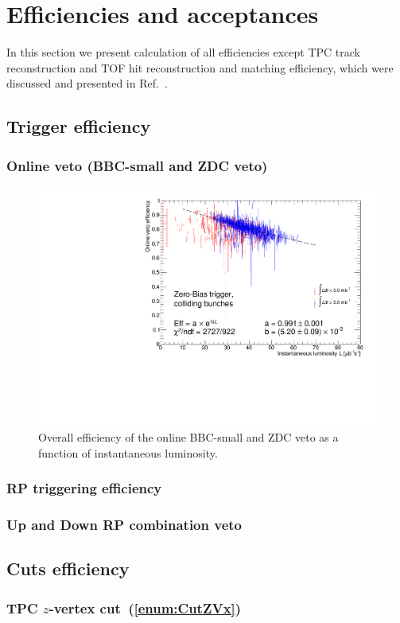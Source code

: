 \section{Efficiencies and acceptances}

In this section we present calculation of all efficiencies except TPC track reconstruction and TOF hit reconstruction and matching efficiency, which were discussed and presented in Ref.~\cite{supplementaryNote}.

\subsection{Trigger efficiency}\label{sec:triggerEff}
\subsubsection{Online veto (BBC-small and ZDC veto)}
\begin{figure}[ht!]
\centering%
\includegraphics[width=0.65\linewidth,page=1]{graphics/corrections/OnlineVetoEffVsInstLumi_graph.pdf}%
\caption{Overall efficiency of the online BBC-small and ZDC veto as a function of instantaneous luminosity.}\label{fig:onlineVetoEff}%
\end{figure}
\subsubsection{RP triggering efficiency}
\subsubsection{Up and Down RP combination veto}
\subsection{Cuts efficiency}\label{sec:cutsEff}
\subsubsection{TPC \texorpdfstring{$z$}{z}-vertex cut~(\ref{enum:CutZVx})}
